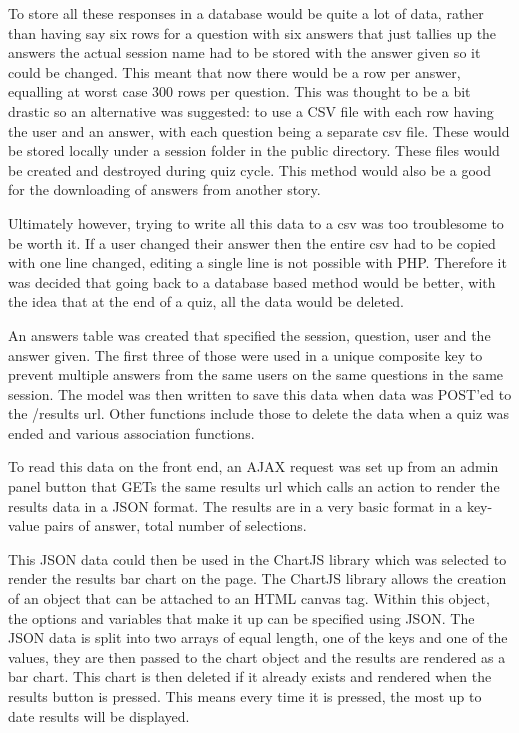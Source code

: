 To store all these responses in a database would be quite a lot of data, rather than having say six rows for a question with six answers that just tallies up the answers the actual session name had to be stored with the answer given so it could be changed. This meant that now there would be a row per answer, equalling at worst case 300 rows per question. This was thought to be a bit drastic so an alternative was suggested: to use a CSV file with each row having the user and an answer, with each question being a separate csv file. These would be stored locally under a session folder in the public directory. These files would be created and destroyed during quiz cycle. This method would also be a good for the downloading of answers from another story. 

Ultimately however, trying to write all this data to a csv was too troublesome to be worth it. If a user changed their answer then the entire csv had to be copied with one line changed, editing a single line is not possible with PHP. Therefore it was decided that going back to a database based method would be better, with the idea that at the end of a quiz, all the data would be deleted.

An answers table was created that specified the session, question, user and the answer given. The first three of those were used in a unique composite key to prevent multiple answers from the same users on the same questions in the same session. The model was then written to save this data when data was POST'ed to the /results url. Other functions include those to delete the data when a quiz was ended and various association functions.

To read this data on the front end, an AJAX request was set up from an admin panel button that GETs the same results url which calls an action to render the results data in a JSON format. The results are in a very basic format in a key-value pairs of answer, total number of selections.

This JSON data could then be used in the ChartJS library which was selected to render the results bar chart on the page\cite{chartjs}. The ChartJS library allows the creation of an object that can be attached to an HTML canvas tag. Within this object, the options and variables that make it up can be specified using JSON. The JSON data is split into two arrays of equal length, one of the keys and one of the values, they are then passed to the chart object and the results are rendered as a bar chart. This chart is then deleted if it already exists and rendered when the results button is pressed. This means every time it is pressed, the most up to date results will be displayed. 
